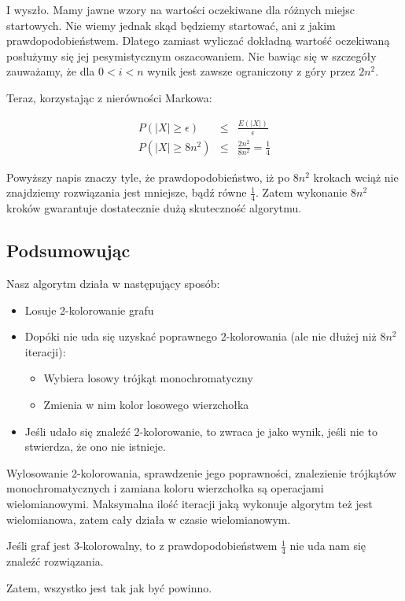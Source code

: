 \documentclass[a4paper,11pt]{article}
\begin{document}
I wyszło. Mamy jawne wzory na wartości oczekiwane dla różnych miejsc startowych.
Nie wiemy jednak skąd będziemy startować, ani z jakim prawdopodobieństwem.
Dlatego zamiast wyliczać dokładną wartość oczekiwaną posłużymy się jej
pesymistycznym oszacowaniem. Nie bawiąc się w szczegóły zauważamy, że dla $0 < i
< n$ wynik jest zawsze ograniczony z góry przez $2n^2$.

Teraz, korzystając z nierówności Markowa:

\begin{eqnarray}
  \nonumber P(|X| \ge \epsilon) & \le & \frac{E(|X|)}{\epsilon} \\
  \nonumber P(|X| \ge 8n^2) & \le & \frac{2n^2}{8n^2} = \frac{1}{4}
\end{eqnarray}

Powyższy napis znaczy tyle, że prawdopodobieństwo, iż po $8n^2$ krokach wciąż
nie znajdziemy rozwiązania jest mniejsze, bądź równe $\frac{1}{4}$. Zatem
wykonanie $8n^2$ kroków gwarantuje dostatecznie dużą skuteczność algorytmu.


\subsection*{Podsumowując}

Nasz algorytm działa w następujący sposób:

\begin{itemize}
  \item{Losuje 2-kolorowanie grafu}
  \item{Dopóki nie uda się uzyskać poprawnego 2-kolorowania (ale nie dłużej niż
        $8n^2$ iteracji):
    \begin{itemize}
      \item{Wybiera losowy trójkąt monochromatyczny}
      \item{Zmienia w nim kolor losowego wierzchołka}
    \end{itemize}
  }
  \item{Jeśli udało się znaleźć 2-kolorowanie, to zwraca je jako wynik, jeśli
        nie to stwierdza, że ono nie istnieje.}
\end{itemize}

Wylosowanie 2-kolorowania, sprawdzenie jego poprawności, znalezienie trójkątów
monochromatycznych i zamiana koloru wierzchołka są operacjami wielomianowymi.
Maksymalna ilość iteracji jaką wykonuje algorytm też jest wielomianowa, zatem
cały działa w czasie wielomianowym.

Jeśli graf jest 3-kolorowalny, to z prawdopodobieństwem $\frac{1}{4}$ nie uda nam
się znaleźć rozwiązania.

Zatem, wszystko jest tak jak być powinno.
\end{document}
